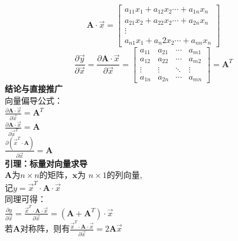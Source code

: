 \documentclass{ctexart}
\begin{document}
    $$
    \bm A\cdot\vec{x}=
    \left[
    \begin{matrix}
      a_{11}x_1+a_{12}x_2\cdots +a_{1n}x_n \\
      a_{21}x_2+a_{22}x_2\cdots +a_{2n}x_n \\
      \vdots \\
      a_{n1}x_1+a_n{2x}_2\cdots +a_{nn}x_n
    \end{matrix}
    \right]
    $$
    $$
    \frac{\partial \vec{y}}{\partial \vec{x}} = \frac{\partial {\bm A\cdot\vec{x}}}{\partial \vec{x}}=
    \left[
    \begin{matrix}
      a_{11} & a_{21} & \cdots & a_{m1} \\
      a_{12} & a_{22} & \cdots & a_{m2} \\
      \vdots & \vdots & \ddots & \vdots \\
      a_{1n} & a_{2n} & \cdots & a_{mn}
    \end{matrix}
    \right]
    =\bm A^T
    $$
    \textbf{结论与直接推广} \\
    向量偏导公式： \\
    $\frac{\partial \bm A\cdot\vec{x}}{\partial \vec{x}} = \bm A^T $ \\
    $\frac{\partial \bm A\cdot\vec{x}}{\partial \vec{x}^T} = \bm A $ \\
    $\frac{\partial (\vec{x}^T\cdot \bm A)}{\partial \vec{x}} = \bm A $ \\
    \textbf{引理：标量对向量求导} \\
    $\bm A$为$n\times n$的矩阵，$\bm x$为 $n\times 1$的列向量,\\
    记$y = \vec{x}^T\cdot\bm A\cdot\vec{x}$ \\
    同理可得： \\
    $\frac{\partial y}{\partial \vec{x}} = \frac{\vec{x}^T\cdot\bm A\cdot\vec{x}}{\partial \vec{x}} = (\bm A + \bm A^T)\cdot\vec{x}$ \\
    若$\bm A 对称阵，则有 \frac{\vec{x}^T\cdot\bm A \cdot\vec{x}}{\partial \vec{x}} = 2\bm A\vec{x}$ \\
\end{document}
